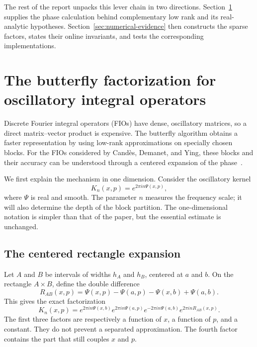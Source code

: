 \documentclass[11pt,a4paper]{article}
\begin{document}
The rest of the report unpacks this lever chain in two directions. Section~\ref{sec:butterfly} supplies the phase calculation behind complementary low rank and its real-analytic hypotheses. Section~\ref{sec:numerical-evidence} then constructs the sparse factors, states their online invariants, and tests the corresponding implementations.


\section{The butterfly factorization for oscillatory integral operators}
\label{sec:butterfly}

Discrete Fourier integral operators (FIOs) have dense, oscillatory matrices, so a direct matrix--vector product is expensive. The butterfly algorithm obtains a faster representation by using low-rank approximations on specially chosen blocks. For the FIOs considered by Cand\`{e}s, Demanet, and Ying, these blocks and their accuracy can be understood through a centered expansion of the phase~\cite{candes2009butterfly}.

We first explain the mechanism in one dimension. Consider the oscillatory kernel
\begin{equation}
    K_n(x,p)=e^{2\pi i n\Psi(x,p)},
    \label{eq:scaled-kernel}
\end{equation}
where $\Psi$ is real and smooth. The parameter $n$ measures the frequency scale; it will also determine the depth of the block partition. The one-dimensional notation is simpler than that of the paper, but the essential estimate is unchanged.

\subsection{The centered rectangle expansion}

Let $A$ and $B$ be intervals of widths $h_A$ and $h_B$, centered at $a$ and $b$. On the rectangle $A\times B$, define the double difference
\begin{equation}
    R_{AB}(x,p)
    =\Psi(x,p)-\Psi(a,p)-\Psi(x,b)+\Psi(a,b).
    \label{eq:rectangle-remainder}
\end{equation}
This gives the exact factorization
\begin{equation}
    K_n(x,p)
    =e^{2\pi i n\Psi(x,b)}
     e^{2\pi i n\Psi(a,p)}
     e^{-2\pi i n\Psi(a,b)}
     e^{2\pi i nR_{AB}(x,p)}.
    \label{eq:centered-factorization}
\end{equation}
The first three factors are respectively a function of $x$, a function of $p$, and a constant. They do not prevent a separated approximation. The fourth factor contains the part that still couples $x$ and $p$.
\end{document}
